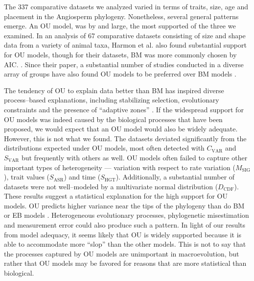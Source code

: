 \documentclass[a4paper,11pt]{article}
\begin{document}
The 337 comparative datasets we analyzed varied in terms of traits, size, age and placement in the Angiosperm phylogeny. Nonetheless, several general patterns emerge. An OU model, was by and large, the most supported of the three we examined. In an analysis of 67 comparative datasets consisting of size and shape data from a variety of animal taxa, Harmon et al. \citep{Harmon2010} also found substantial support for OU models, though for their datasets, BM was more commonly chosen by AIC. \citep[We note, however, that many of their datasets were quite small; see][]{SlaterPennell}. Since their paper, a substantial number of studies conducted in a diverse array of groups have also found OU models to be preferred over BM models \citep[e.g.,][]{Burbrink2012, Wiens2013, Lopez2013, Thomaspreprint}. 

The tendency of OU to explain data better than BM has inspired diverse process--based explanations, including stabilizing selection, evolutionary constraints and the presence of ``adaptive zones'' \citep{HansenMartins1996, ButlerKing2004, Hansen2012book, PennellHarmon}. 
If the widespread support for OU models was indeed caused by the biological processes that have been proposed, we would expect that an OU model would also be widely adequate. However, this is not what we found. The datasets deviated significantly from the distributions expected under OU models, most often detected with $C_{\text{VAR}}$ and $S_{\text{VAR}}$ but frequently with others as well. OU models often failed to capture other important types of heterogeneity --- variation with respect to rate variation ($M_{\text{SIG}}$), trait values ($S_{\text{ASR}}$) and time ($S_{\text{HGT}}$). Additionally, a substantial number of datasets were not well--modeled by a multivariate normal distribution ($D_{\text{CDF}}$). These results suggest a statistical explanation for the high support for OU models. OU predicts higher variance near the tips of the phylogeny than do BM or EB models \citep[see figure 1 in][]{Harmon2010}. Heterogeneous evolutionary processes, phylogenetic misestimation and measurement error could also produce such a pattern. In light of our results from model adequacy, it seems likely that OU is widely supported because it is able to accommodate more ``slop'' than the other models.  This is not to say that the processes captured by OU models are unimportant in macroevolution, but rather that OU models may be favored for reasons that are more statistical than biological.
\end{document}
